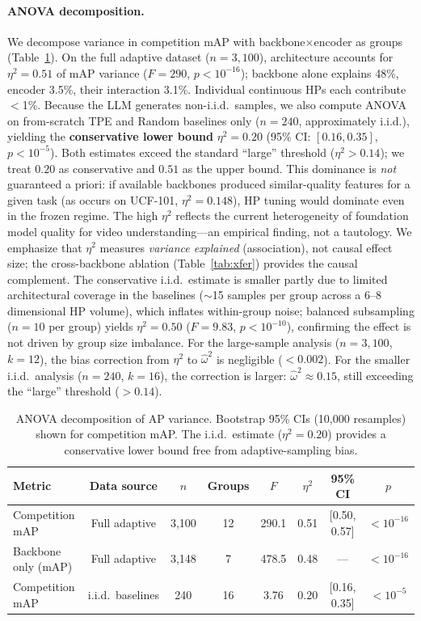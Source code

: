 \documentclass{article}
\begin{document}
\paragraph{ANOVA decomposition.}
We decompose variance in competition mAP with backbone$\times$encoder as groups (Table~\ref{tab:anova}).
On the full adaptive dataset ($n = 3{,}100$), architecture accounts for $\eta^2 = 0.51$ of mAP variance ($F = 290$, $p < 10^{-16}$); backbone alone explains 48\%, encoder 3.5\%, their interaction 3.1\%.
Individual continuous HPs each contribute $<$1\%.
Because the LLM generates non-i.i.d.\ samples, we also compute ANOVA on from-scratch TPE and Random baselines only ($n = 240$, approximately i.i.d.), yielding the \textbf{conservative lower bound} $\eta^2 = 0.20$ (95\% CI: $[0.16, 0.35]$, $p < 10^{-5}$).
Both estimates exceed the standard ``large'' threshold ($\eta^2 > 0.14$); we treat $0.20$ as conservative and $0.51$ as the upper bound.
This dominance is \emph{not} guaranteed a priori: if available backbones produced similar-quality features for a given task (as occurs on UCF-101, $\eta^2 = 0.148$), HP tuning would dominate even in the frozen regime. The high $\eta^2$ reflects the current heterogeneity of foundation model quality for video understanding---an empirical finding, not a tautology.
We emphasize that $\eta^2$ measures \emph{variance explained} (association), not causal effect size; the cross-backbone ablation (Table~\ref{tab:xfer}) provides the causal complement.
The conservative i.i.d.\ estimate is smaller partly due to limited architectural coverage in the baselines ($\sim$15 samples per group across a 6--8 dimensional HP volume), which inflates within-group noise; balanced subsampling ($n = 10$ per group) yields $\eta^2 = 0.50$ ($F = 9.83$, $p < 10^{-10}$), confirming the effect is not driven by group size imbalance.
For the large-sample analysis ($n = 3{,}100$, $k = 12$), the bias correction from $\eta^2$ to $\hat{\omega}^2$ is negligible ($< 0.002$).
For the smaller i.i.d.\ analysis ($n = 240$, $k = 16$), the correction is larger: $\hat{\omega}^2 \approx 0.15$, still exceeding the ``large'' threshold ($> 0.14$).

\begin{table}[t]
\centering
\caption{ANOVA decomposition of AP variance. Bootstrap 95\% CIs (10{,}000 resamples) shown for competition mAP. The i.i.d.\ estimate ($\eta^2 = 0.20$) provides a conservative lower bound free from adaptive-sampling bias.}
\label{tab:anova}
\small
\begin{tabular}{@{}lccccccc@{}}
\toprule
Metric & Data source & $n$ & Groups & $F$ & $\eta^2$ & 95\% CI & $p$ \\
\midrule
Competition mAP & Full adaptive & 3{,}100 & 12 & 290.1 & 0.51 & [0.50, 0.57] & $< 10^{-16}$ \\
Backbone only (mAP) & Full adaptive & 3{,}148 & 7 & 478.5 & 0.48 & --- & $< 10^{-16}$ \\
\midrule
Competition mAP & i.i.d.\ baselines & 240 & 16 & 3.76 & 0.20 & [0.16, 0.35] & $< 10^{-5}$ \\
\bottomrule
\end{tabular}
\end{table}
\end{document}
